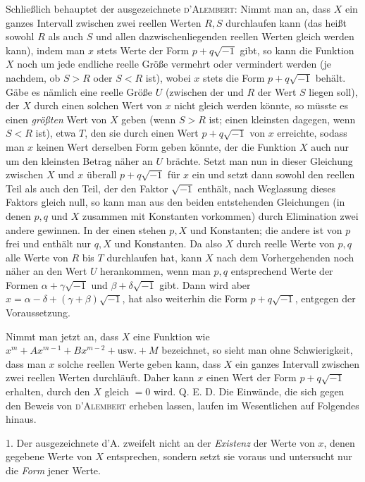 Schließlich behauptet der ausgezeichnete \textsc{d'Alembert}: Nimmt man an, dass $X$ ein ganzes Intervall zwischen zwei reellen Werten $R,S$ durchlaufen kann (das heißt sowohl $R$ als auch $S$ und allen dazwischenliegenden reellen Werten gleich werden kann), indem man $x$ stets Werte der Form $p+q\sqrt{-1}$ gibt, so kann die Funktion $X$ noch um jede endliche reelle Größe vermehrt oder vermindert werden (je nachdem, ob $S>R$ oder $S<R$ ist), wobei $x$ stets die Form $p+q\sqrt{-1}$ behält. Gäbe es nämlich eine reelle Größe $U$ (zwischen der und $R$ der Wert $S$ liegen soll), der $X$ durch einen solchen Wert von $x$ nicht gleich werden könnte, so müsste es einen \textit{größten} Wert von $X$ geben (wenn $S>R$ ist; einen kleinsten dagegen, wenn $S<R$ ist), etwa $T$, den sie durch einen Wert $p+q\sqrt{-1}$ von $x$ erreichte, sodass man $x$ keinen Wert derselben Form geben könnte, der die Funktion $X$ auch nur um den kleinsten Betrag näher an $U$ brächte. Setzt man nun in dieser Gleichung zwischen $X$ und $x$ überall $p+q\sqrt{-1}$ für $x$ ein und setzt dann sowohl den reellen Teil als auch den Teil, der den Faktor $\sqrt{-1}$ enthält, nach Weglassung dieses Faktors gleich null, so kann man aus den beiden entstehenden Gleichungen (in denen $p,q$ und $X$ zusammen mit Konstanten vorkommen) durch Elimination zwei andere gewinnen. In der einen stehen $p,X$ und Konstanten; die andere ist von $p$ frei und enthält nur $q,X$ und Konstanten. Da also $X$ durch reelle Werte von $p,q$ alle Werte von $R$ bis $T$ durchlaufen hat, kann $X$ nach dem Vorhergehenden noch näher an den Wert $U$ herankommen, wenn man $p,q$ entsprechend Werte der Formen $\alpha+\gamma\sqrt{-1}$ und $\beta+\delta\sqrt{-1}$ gibt. Dann wird aber $x=\alpha-\delta+(\gamma+\beta)\sqrt{-1}$, hat also weiterhin die Form $p+q\sqrt{-1}$, entgegen der Voraussetzung.

Nimmt man jetzt an, dass $X$ eine Funktion wie $x^m+Ax^{m-1}+Bx^{m-2}+\text{usw.}+M$ bezeichnet, so sieht man ohne Schwierigkeit, dass man $x$ solche reellen Werte geben kann, dass $X$ ein ganzes Intervall zwischen zwei reellen Werten durchläuft. Daher kann $x$ einen Wert der Form $p+q\sqrt{-1}$ erhalten, durch den $X$ gleich $=0$ wird. Q. E. D.
Die Einwände, die sich gegen den Beweis von \textsc{d'Alembert} erheben lassen, laufen im Wesentlichen auf Folgendes hinaus.

1. Der ausgezeichnete d'A. zweifelt nicht an der \textit{Existenz} der Werte von $x$, denen gegebene Werte von $X$ entsprechen, sondern setzt sie voraus und untersucht nur die \textit{Form} jener Werte.

